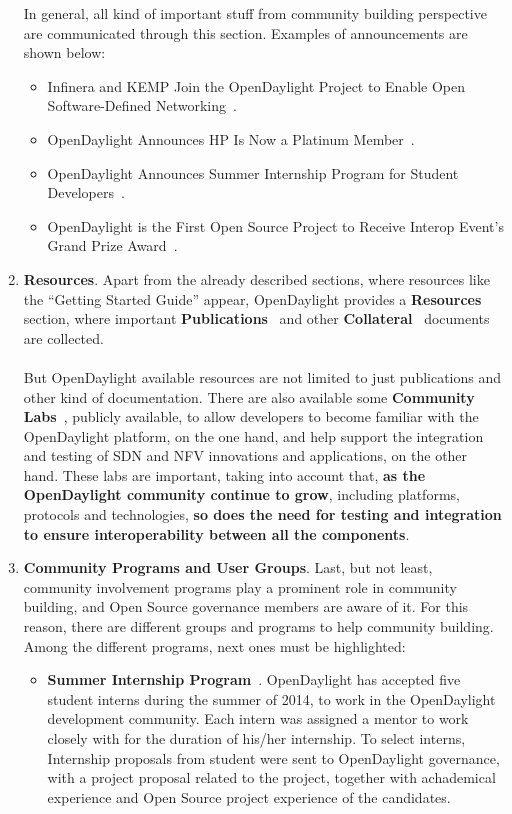 \documentclass[a4paper, 12pt]{book}
\begin{document}
\begin{enumerate}
\begin{itemize}
\end{itemize}
In general, all kind of important stuff from community building perspective are communicated through this section. Examples of announcements are shown below:
\begin{itemize}\itemsep0pt
\item{Infinera and KEMP Join the OpenDaylight Project to Enable Open Software-Defined Networking}~\cite{OpenDaylightAnnouncement01}.
\item{OpenDaylight Announces HP Is Now a Platinum Member}~\cite{OpenDaylightAnnouncement02}.
\item{OpenDaylight Announces Summer Internship Program for Student Developers}~\cite{OpenDaylightAnnouncement03}.
\item{OpenDaylight is the First Open Source Project to Receive Interop Event’s Grand Prize Award}~\cite{OpenDaylightAnnouncement04}.
\end{itemize}
\item{\textbf{Resources}}. Apart from the already described sections, where resources like the ``Getting Started Guide'' appear, OpenDaylight provides a \textbf{Resources~\cite{Resources}} section, where important \textbf{Publications}~\cite{OpenDaylightPublications} and other \textbf{Collateral}~\cite{OpenDaylightCollateral} documents are collected.\\
\\
But OpenDaylight available resources are not limited to just publications and other kind of documentation. There are also available some \textbf{Community Labs}~\cite{OpenDaylightCommunityLabs}, publicly available, to allow developers to become familiar with the OpenDaylight platform, on the one hand, and help support the integration and testing of SDN and NFV innovations and applications, on the other hand. These labs are important, taking into account that, \textbf{as the OpenDaylight community continue to grow}, including platforms, protocols and technologies, \textbf{so does the need for testing and integration to ensure interoperability between all the components}.
\item{\textbf{Community Programs and User Groups}}. Last, but not least, community involvement programs play a prominent role in community building, and Open Source governance members are aware of it. For this reason, there are different groups and programs to help community building. Among the different programs, next ones must be highlighted:
\begin{itemize}\itemsep0pt
\item{\textbf{Summer Internship Program}~\cite{OpenDaylightInternshipProgram}}. OpenDaylight has accepted five student interns during the summer of 2014, to work in the OpenDaylight development community. Each intern was assigned a mentor to work closely with for the duration of his/her internship. To select interns, Internship proposals from student were sent to OpenDaylight governance, with a project proposal related to the project, together with achademical experience and Open Source project experience of the candidates.

\end{itemize}
\end{enumerate}
\end{document}
